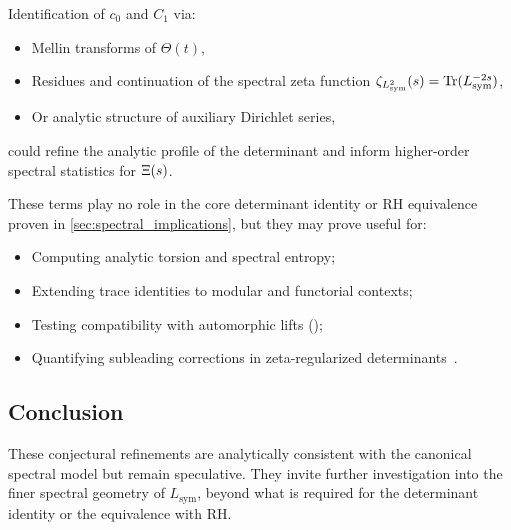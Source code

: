 Identification of \( c_0 \) and \( C_1 \) via:
\begin{itemize}
  \item Mellin transforms of \( \Theta(t) \),
  \item Residues and continuation of the spectral zeta function \( \zeta_{L_{\mathrm{sym}}^2}(s) = \operatorname{Tr}(L_{\mathrm{sym}}^{-2s}) \),
  \item Or analytic structure of auxiliary Dirichlet series,
\end{itemize}
could refine the analytic profile of the determinant and inform higher-order spectral statistics for \( \Xi(s) \).

\medskip

These terms play no role in the core determinant identity or RH equivalence proven in \cref{sec:spectral_implications}, but they may prove useful for:

\begin{itemize}
  \item Computing analytic torsion and spectral entropy;
  \item Extending trace identities to modular and functorial contexts;
  \item Testing compatibility with automorphic lifts ();
  \item Quantifying subleading corrections in zeta-regularized determinants~\cite{Elizalde1994ZetaRegularization}.
\end{itemize}

\subsection*{Conclusion}

These conjectural refinements are analytically consistent with the canonical spectral model but remain speculative. They invite further investigation into the finer spectral geometry of \( L_{\mathrm{sym}} \), beyond what is required for the determinant identity or the equivalence with RH.
